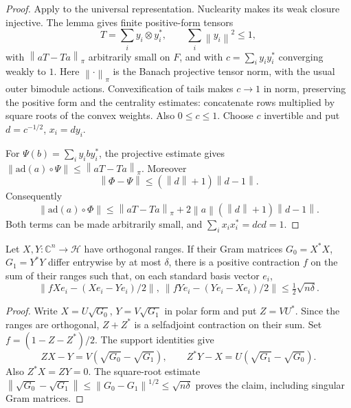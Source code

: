 \begin{proof}
Apply \cite[Lemma 4.2]{KishimotoOzawaSakai2003} to the universal representation. Nuclearity
makes its weak closure injective. The lemma gives finite positive-form
tensors 
\begin{equation*}
T=\sum_i y_i\otimes y_i^*,\qquad \sum_i\left\|y_i\right\|^2\leq1,
\end{equation*}
with $\left\|aT-Ta\right\|_\pi$ arbitrarily small on $F$, and with $c=\sum_i
y_iy_i^*$ converging weakly to $1$. Here $\left\|\cdot\right\|_\pi$ is the
Banach projective tensor norm, with the usual outer bimodule actions.
Convexification of tails makes $c\to1$ in norm, preserving the positive form
and the centrality estimates: concatenate rows multiplied by square roots of
the convex weights. Also $0\leq c\leq1$. Choose $c$ invertible and put $d=c^{-1/2}$, $x_i=dy_i$.

For $\Psi(b)=\sum_i y_i b y_i^*$, the projective estimate gives $\left\|\mathrm{ad}(a)\circ\Psi\right\|\leq\left\|aT-Ta\right\|_\pi$. Moreover 
\begin{equation*}
\left\|\Phi-\Psi\right\|\leq(\left\|d\right\|+1)\left\|d-1\right\|.
\end{equation*}
Consequently 
\begin{equation*}
\left\|\mathrm{ad}(a)\circ\Phi\right\| \leq\left\|aT-Ta\right\|_\pi+
2\left\|a\right\|(\left\|d\right\|+1)\left\|d-1\right\|.
\end{equation*}
Both terms can be made arbitrarily small, and $\sum_i x_ix_i^*=dcd=1$.
\end{proof}

\begin{lemma}\label{lem:cu-gram}
 Let $X,Y:\mathbb{C}^n\to\mathcal{H}$ have orthogonal
ranges. If their Gram matrices $G_0=X^*X$, $G_1=Y^*Y$ differ entrywise by at
most $\delta$, there is a positive contraction $f$ on the sum of their
ranges such that, on each standard basis vector $e_i$, 
\begin{equation*}
\left\|fXe_i-(Xe_i-Ye_i)/2\right\|,\ \left\|fYe_i-(Ye_i-Xe_i)/2\right\|
\leq\tfrac12\sqrt{n\delta}.
\end{equation*}
\end{lemma}

\begin{proof}
Write $X=U\sqrt{G_0}$, $Y=V\sqrt{G_1}$ in polar form and put $Z=VU^*$. Since
the ranges are orthogonal, $Z+Z^*$ is a selfadjoint contraction on their
sum. Set $f=(1-Z-Z^*)/2$. The support identities give 
\begin{equation*}
ZX-Y=V(\sqrt{G_0}-\sqrt{G_1}),\qquad Z^*Y-X=U(\sqrt{G_1}-\sqrt{G_0}).
\end{equation*}
Also $Z^*X=ZY=0$. The square-root estimate $\left\|\sqrt{G_0}-\sqrt{G_1}\right\|\leq\left\|G_0-G_1\right\|^{1/2} \leq\sqrt{n\delta}$ proves the
claim, including singular Gram matrices.
\end{proof}

